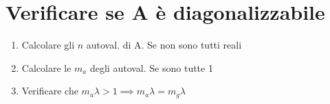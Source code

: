 \section{Verificare se A è diagonalizzabile}
\begin{enumerate}[noitemsep]
	\item Calcolare gli $n$ autoval. di A. Se non sono tutti reali \Frowny{}
	\item Calcolare le $m_a$ degli autoval. Se sono tutte 1 \Smiley{}
	\item Verificare che $m_a \lambda > 1 \implies m_a \lambda = m_g \lambda$ \Smiley{}
\end{enumerate}

